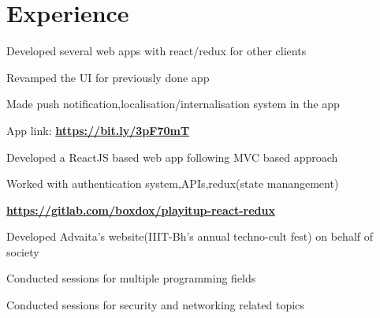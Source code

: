 \documentclass[]{deedy-resume-openfont}
\begin{document}
\begin{minipage}[t]{0.66\textwidth} 


\section{Experience}
\vspace{\topsep} %
\begin{tightemize}
\item Developed several web apps with react/redux for other clients  
\item Revamped the UI for previously done app
\item Made push notification,localisation/internalisation system in the app
\item App link: \textbf{\href{https://bit.ly/3pF70mT}{https://bit.ly/3pF70mT}}
\end{tightemize}
\sectionsep

\vspace{\topsep} %
\begin{tightemize}
\item Developed a ReactJS based web app following MVC based approach
\item Worked with authentication system,APIs,redux(state manangement)
\item \textbf{\href{https://gitlab.com/boxdox/playitup-react-redux}{https://gitlab.com/boxdox/playitup-react-redux}}
\end{tightemize}
\sectionsep

\begin{tightemize}
\item Developed Advaita's website(IIIT-Bh's annual techno-cult fest) on behalf of society
\item Conducted sessions for multiple programming fields
\end{tightemize}
\sectionsep

\begin{tightemize}
\item Conducted sessions for security and networking related topics
\end{tightemize}
\sectionsep


\end{minipage}
\end{document}
